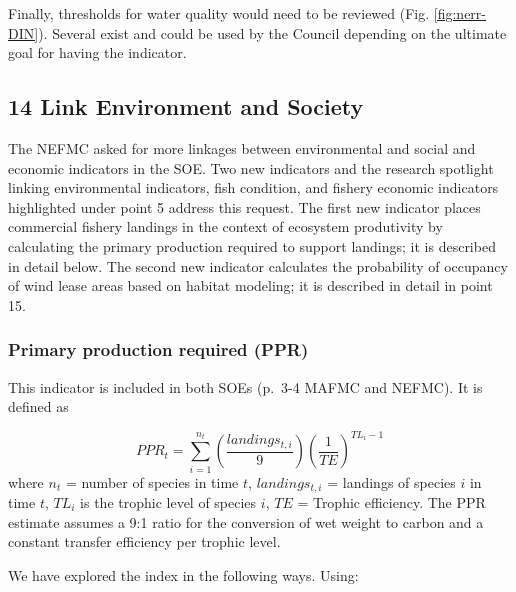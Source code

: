 \documentclass[
  10pt,
]{article}
\begin{document}
Finally, thresholds for water quality would need to be reviewed (Fig.
\ref{fig:nerr-DIN}). Several exist and could be used by the Council
depending on the ultimate goal for having the indicator.

\hypertarget{link-environment-and-society}{%
\subsection{14 Link Environment and
Society}\label{link-environment-and-society}}

The NEFMC asked for more linkages between environmental and social and
economic indicators in the SOE. Two new indicators and the research
spotlight linking environmental indicators, fish condition, and fishery
economic indicators highlighted under point 5 address this request. The
first new indicator places commercial fishery landings in the context of
ecosystem produtivity by calculating the primary production required to
support landings; it is described in detail below. The second new
indicator calculates the probability of occupancy of wind lease areas
based on habitat modeling; it is described in detail in point 15.

\hypertarget{primary-production-required-ppr}{%
\subsubsection{Primary production required
(PPR)}\label{primary-production-required-ppr}}

This indicator is included in both SOEs (p.~3-4 MAFMC and NEFMC). It is
defined as

\[PPR_t = \sum_{i=1}^{n_t}  \left(\frac{landings_{t,i}}{9}\right) \left(\frac{1}{TE}\right)^{TL_i-1}\]
where \(n_t\) = number of species in time \(t\), \(landings_{t,i}\) =
landings of species \(i\) in time \(t\), \(TL_i\) is the trophic level
of species \(i\), \(TE\) = Trophic efficiency. The PPR estimate assumes
a 9:1 ratio for the conversion of wet weight to carbon and a constant
transfer efficiency per trophic level.

We have explored the index in the following ways. Using:
\end{document}
